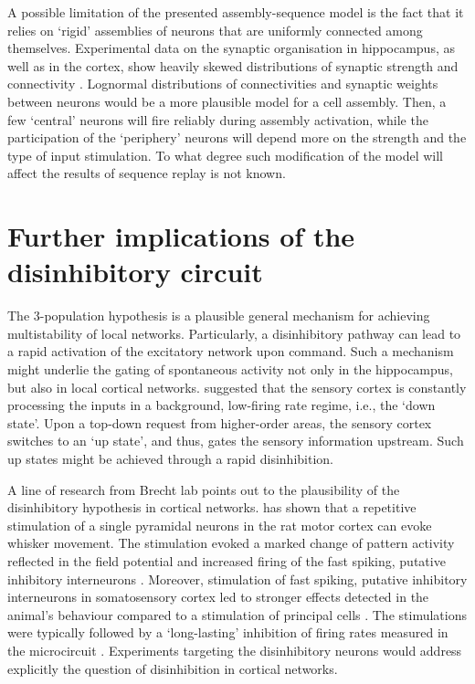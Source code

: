   A possible limitation of the presented assembly-sequence model is the fact
  that it relies on `rigid' assemblies of neurons that are uniformly connected
  among themselves. Experimental data on the synaptic organisation in
  hippocampus, as well as in the cortex, show heavily skewed distributions of
  synaptic strength and connectivity \citep[e.g.,][]{Takahashi2010,
  Buzsaki2014, Cossell2015}. Lognormal distributions of connectivities and
  synaptic weights between neurons would be a more plausible model for a cell
  assembly. Then, a few `central' neurons will fire reliably during assembly
  activation, while the participation of the `periphery' neurons will depend
  more on the strength and the type of input stimulation. To what degree such
  modification of the model will affect the results of sequence replay is not
  known.

\section{Further implications of the disinhibitory circuit}
  The 3-population hypothesis is a plausible general mechanism for achieving
  multistability of local networks. Particularly, a disinhibitory pathway can
  lead to a rapid activation of the excitatory network upon command. Such a
  mechanism might underlie the gating of spontaneous activity not only in the
  hippocampus, but also in local cortical networks. \cite{Luczak2013} suggested
  that the sensory cortex is constantly processing the inputs in a background,
  low-firing rate regime, i.e., the `down state'. Upon a top-down request from
  higher-order areas, the sensory cortex switches to an `up state', and thus,
  gates the sensory information upstream. Such up states might be achieved
  through a rapid disinhibition.

  A line of research from Brecht lab points out to the plausibility of the
  disinhibitory hypothesis in cortical networks. \cite{Brecht2004} has shown
  that a repetitive stimulation of a single pyramidal neurons in the rat motor
  cortex can evoke whisker movement. The stimulation evoked a marked change of
  pattern activity reflected in the field potential and increased firing of the
  fast spiking, putative inhibitory interneurons \citep{Houweling2007,
  Doron2014}. Moreover, stimulation of fast spiking, putative inhibitory
  interneurons in somatosensory cortex led to stronger effects detected in the
  animal's behaviour compared to a stimulation of principal cells
  \citep{Doron2014}. The stimulations were typically followed by a
  `long-lasting' inhibition of firing rates measured in the microcircuit
  \citep{Doron2014}. Experiments targeting the disinhibitory neurons would
  address explicitly the question of disinhibition in cortical networks.
  
